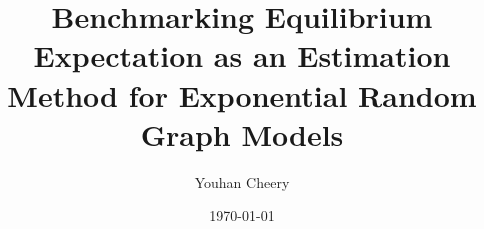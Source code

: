 \documentclass[10pt]{article}
\title{Benchmarking Equilibrium Expectation as an Estimation Method for Exponential Random Graph Models}
\author{Youhan Cheery}
\date{\today}
\begin{document}
\maketitle
\pagebreak
\tableofcontents
\pagebreak

















\end{document}
